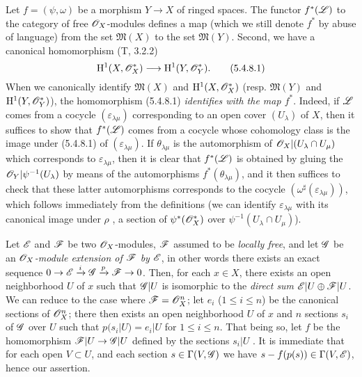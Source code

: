 \begin{env}[5.4.8]
\label{0.5.4.8}
Let $f=(\psi,\omega)$ be a morphism $Y\to X$ of ringed spaces.
The functor $f^*(\mathscr{L})$ to the category of free $\mathscr{O}_X$-modules defines a map (which we still denote $f^*$ by abuse of language) from the set $\mathfrak{M}(X)$ to the set $\mathfrak{M}(Y)$.
Second, we have a canonical homomorphism (T, 3.2.2)
\[
  \HH^1(X,\sh{O}_X^*)\to\HH^1(Y,\sh{O}_Y^*).
  \tag{5.4.8.1}
\]
When we canonically identify  $\mathfrak{M}(X)$ and $\mathrm{H}^1(X,\mathscr{O}_X^*)$ (resp. $\mathfrak{M}(Y)$ and $\mathrm{H}^1(Y,\mathscr{O}_Y^*)$), the homomorphism (5.4.8.1) \emph{identifies with the map $f^*$}.
Indeed, if $\mathscr{L}$ comes from a cocycle $(\varepsilon_{\lambda\mu})$ corresponding to an open cover $(U_\lambda)$ of $X$, then it suffices to show that $f^*(\mathscr{L})$ comes from a cocycle whose cohomology class is the image under (5.4.8.1) of $(\varepsilon_{\lambda\mu})$.
If $\theta_{\lambda\mu}$ is the automorphism of $\mathscr{O}_X|(U_\lambda\cap U_\mu)$ which corresponds to $\varepsilon_{\lambda\mu}$, then it is clear that $f^*(\mathscr{L})$ is obtained by gluing the $\mathscr{O}_Y|\psi^{-1}(U_\lambda)$ by means of the automorphisms $f^*(\theta_{\lambda\mu})$, and it then suffices to check that these latter automorphisms corresponds to the cocycle $(\omega^\sharp(\varepsilon_{\lambda\mu}))$, which follows immediately from the definitions (we can identify $\varepsilon_{\lambda\mu}$ with its canonical image under $\rho$ , a section of $\psi^*(\mathscr{O}_X^*)$ over $\psi^{-1}(U_\lambda\cap U_\mu)$).
\end{env}

\begin{env}[5.4.9]
\label{0.5.4.9}
Let $\mathscr{E}$ and $\mathscr{F}$ be two $\mathscr{O}_X$-modules, $\mathscr{F}$ assumed to be \emph{locally free}, and let $\mathscr{G}$ be an \emph{$\mathscr{O}_X$-module extension of $\mathscr{F}$ by $\mathscr{E}$}, in other words there exists an exact sequence $0\to\sh{E}\xrightarrow{i}\sh{G}\xrightarrow{p}\sh{F}\to 0$.
Then, for each $x\in X$, there exists an open neighborhood $U$ of $x$ such that $\mathscr{G}|U$ is isomorphic to the \emph{direct sum $\mathscr{E}|U\oplus\mathscr{F}|U$}.
We can reduce to the case where $\mathscr{F}=\mathscr{O}_X^n$; let $e_i$ ($1\leq i\leq n$) be the canonical sections  of $\mathscr{O}_X^n$; there then exists an open neighborhood $U$ of $x$ and $n$ sections $s_i$ of $\mathscr{G}$ over $U$ such that $p(s_i|U)=e_i|U$ for $1\leq i\leq n$.
That being so, let $f$ be the homomorphism $\sh{F}|U\to\sh{G}|U$ defined by the sections $s_i|U$ .
It is immediate that for each open $V\subset U$, and each section $s\in\Gamma(V,\mathscr{G})$ we have $s-f(p(s))\in\Gamma(V,\mathscr{E})$, hence our assertion.
\end{env}

